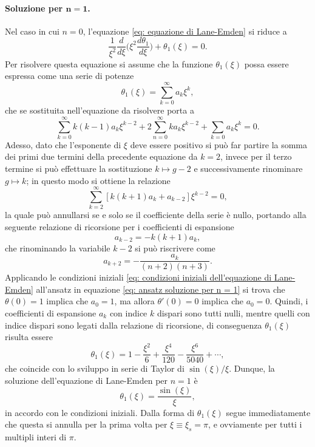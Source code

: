 \documentclass{article}
\numberwithin{equation}{section}
\begin{document}
\paragraph{Soluzione per $\bm{n = 1}$.} Nel caso in cui $n = 0$, l'equazione \eqref{eq: equazione di Lane-Emden} si riduce a 
\begin{equation}
    \frac{1}{\xi^2}\frac{d}{d\xi}\bigg(\xi^2\frac{d\theta_1}{d\xi}\bigg) + \theta_1(\xi) = 0.
\end{equation}
Per risolvere questa equazione si assume che la funzione $\theta_1(\xi)$ possa essere espressa come una serie di potenze 
\begin{equation}
\label{eq: ansatz soluzione per n = 1}
    \theta_1(\xi) = \sum_{k=0}^\infty a_k\xi^k,
\end{equation}
che se sostituita nell'equazione da risolvere porta a
\begin{equation}
    \sum_{k=0}^\infty k(k - 1)a_k\xi^{k - 2} + 2\sum_{n=0}^\infty ka_k\xi^{k - 2} + \sum_{k = 0}a_k\xi^k = 0.
\end{equation}
Adesso, dato che l'esponente di $\xi$ deve essere positivo si può far partire la somma dei primi due termini della precedente equazione da $k = 2$, invece per il terzo termine si può effettuare la sostituzione $k \mapsto g - 2$ e successivamente rinominare $g \mapsto k$; in questo modo si ottiene la relazione
\begin{equation}
    \sum_{k = 2}^\infty[k(k + 1)a_k + a_{k - 2}]\xi^{k - 2} = 0,
\end{equation}
la quale può annullarsi se e solo se il coefficiente della serie è nullo, portando alla seguente relazione di ricorsione per i coefficienti di espansione
\begin{equation}
    a_{k - 2} = -k(k + 1)a_k,
\end{equation}
che rinominando la variabile $k - 2$ si può riscrivere come
\begin{equation}
    a_{k + 2} = -\frac{a_k}{(n + 2)(n + 3)}.
\end{equation}
Applicando le condizioni iniziali \eqref{eq: condizioni iniziali dell'equazione di Lane-Emden} all'ansatz in equazione \eqref{eq: ansatz soluzione per n = 1} si trova che $\theta(0) = 1$ implica che $a_0 = 1$, ma allora $\theta'(0) = 0$ implica che $a_0 = 0$. Quindi, i coefficienti di espansione $a_k$ con indice $k$ dispari sono tutti nulli, mentre quelli con indice dispari sono legati dalla relazione di ricorsione, di conseguenza $\theta_1(\xi)$ risulta essere
\begin{equation}
    \theta_1(\xi) = 1 - \frac{\xi^2}{6} + \frac{\xi^4}{120} - \frac{\xi^6}{5040} + \cdots,
\end{equation}
che coincide con lo sviluppo in serie di Taylor di $\sin(\xi)/\xi$. Dunque, la soluzione dell'equazione di Lane-Emden per $n = 1$ è
\begin{equation}
\label{eq: soluzione per n = 1}
    \theta_1(\xi) = \frac{\sin(\xi)}{\xi},
\end{equation}
in accordo con le condizioni iniziali. Dalla forma di $\theta_1(\xi)$ segue immediatamente che questa si annulla per la prima volta per $\xi \equiv \xi_s = \pi$, e ovviamente per tutti i multipli interi di $\pi$. 
\end{document}
